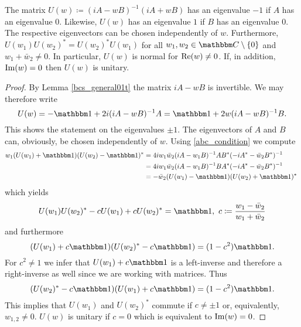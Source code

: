 \begin{lemma}\label{bcs_general02t}
The matrix $U(w)\coloneqq (iA-wB)^{-1}(iA+wB)$ has an eigenvalue $-1$ if $A$ has an eigenvalue $0$. Likewise,
$U(w)$ has an eigenvalue $1$ if $B$ has an eigenvalue $0$. The respective eigenvectors can be chosen independently of $w$.
Furthermore, $U(w_1)U(w_2)^*=U(w_2)^*U(w_1)$ for all $w_1,w_2\in\C\setminus\{0\}$ and $w_1+\bar w_2\neq 0$. 
In particular, $U(w)$ is normal for $\operatorname{Re}(w)\neq 0$. If, in addition, $\operatorname{Im}(w)=0$ then $U(w)$ is unitary.
\end{lemma}
\begin{proof}
By Lemma \ref{bcs_general01t} the matrix $iA-wB$ is invertible. We may therefore write
\begin{equation*}
  U(w) = -\id + 2i(iA-wB)^{-1}A = \id + 2w(iA-wB)^{-1}B .
\end{equation*}
This shows the statement on the eigenvalues $\pm 1$.
The eigenvectors of $A$ and $B$ can, obviously, be chosen independently of $w$.
Using \eqref{abc_condition} we compute
\begin{equation*}
\begin{split}
  w_1(U(w_1)+\id)(U(w_2)-\id)^*
   & = 4iw_1\bar w_2 (iA-w_1B)^{-1}AB^*(-iA^*-\bar w_2B^*)^{-1}\\
   & = 4iw_1\bar w_2 (iA-w_1B)^{-1}BA^*(-iA^*-\bar w_2B^*)^{-1}\\
   & = -\bar w_2(U(w_1)-\id)(U(w_2)+\id)^*\
\end{split}
\end{equation*}
which yields
\begin{equation*}
  U(w_1)U(w_2)^* - cU(w_1)+ cU(w_2)^* = \id,\ c\coloneqq\frac{w_1-\bar w_2}{w_1+\bar w_2}
\end{equation*}
and furthermore
\begin{equation*}
  ( U(w_1)+c\id )( U(w_2)^*-c\id ) = (1-c^2)\id .
\end{equation*}
For $c^2\neq 1$ we infer that $U(w_1)+c\id$ is a left-inverse and therefore a right-inverse 
as well since we are working with matrices. Thus
\begin{equation*}
  ( U(w_2)^* - c\id )( U(w_1) + c\id ) = (1-c^2)\id .
\end{equation*}
This implies that $U(w_1)$ and $U(w_2)^*$ commute if $c\neq \pm 1$ or, equivalently, $w_{1,2}\neq 0$.
$U(w)$ is unitary if $c=0$ which is equivalent to $\operatorname{Im}(w)=0$.
\end{proof}

